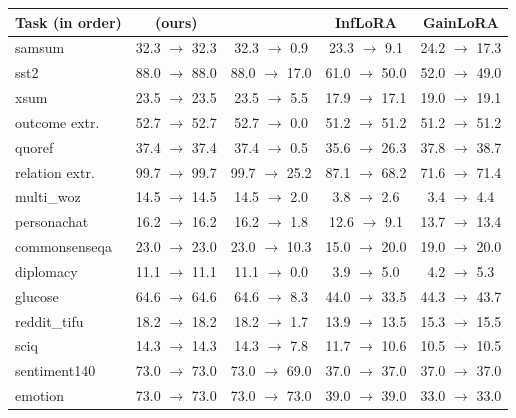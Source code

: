 \begin{tabular}{lcccc}
    \toprule
    Task (in order) & \cert{} (ours) & \plain{} & InfLoRA & GainLoRA \\
    \midrule
    samsum & 32.3 $\to$ 32.3 & 32.3 $\to$ 0.9 & 23.3 $\to$ 9.1 & 24.2 $\to$ 17.3 \\
    sst2 & 88.0 $\to$ 88.0 & 88.0 $\to$ 17.0 & 61.0 $\to$ 50.0 & 52.0 $\to$ 49.0 \\
    xsum & 23.5 $\to$ 23.5 & 23.5 $\to$ 5.5 & 17.9 $\to$ 17.1 & 19.0 $\to$ 19.1 \\
    outcome extr. & 52.7 $\to$ 52.7 & 52.7 $\to$ 0.0 & 51.2 $\to$ 51.2 & 51.2 $\to$ 51.2 \\
    quoref & 37.4 $\to$ 37.4 & 37.4 $\to$ 0.5 & 35.6 $\to$ 26.3 & 37.8 $\to$ 38.7 \\
    relation extr. & 99.7 $\to$ 99.7 & 99.7 $\to$ 25.2 & 87.1 $\to$ 68.2 & 71.6 $\to$ 71.4 \\
    multi\_woz & 14.5 $\to$ 14.5 & 14.5 $\to$ 2.0 & 3.8 $\to$ 2.6 & 3.4 $\to$ 4.4 \\
    personachat & 16.2 $\to$ 16.2 & 16.2 $\to$ 1.8 & 12.6 $\to$ 9.1 & 13.7 $\to$ 13.4 \\
    commonsenseqa & 23.0 $\to$ 23.0 & 23.0 $\to$ 10.3 & 15.0 $\to$ 20.0 & 19.0 $\to$ 20.0 \\
    diplomacy & 11.1 $\to$ 11.1 & 11.1 $\to$ 0.0 & 3.9 $\to$ 5.0 & 4.2 $\to$ 5.3 \\
    glucose & 64.6 $\to$ 64.6 & 64.6 $\to$ 8.3 & 44.0 $\to$ 33.5 & 44.3 $\to$ 43.7 \\
    reddit\_tifu & 18.2 $\to$ 18.2 & 18.2 $\to$ 1.7 & 13.9 $\to$ 13.5 & 15.3 $\to$ 15.5 \\
    sciq & 14.3 $\to$ 14.3 & 14.3 $\to$ 7.8 & 11.7 $\to$ 10.6 & 10.5 $\to$ 10.5 \\
    sentiment140 & 73.0 $\to$ 73.0 & 73.0 $\to$ 69.0 & 37.0 $\to$ 37.0 & 37.0 $\to$ 37.0 \\
    emotion & 73.0 $\to$ 73.0 & 73.0 $\to$ 73.0 & 39.0 $\to$ 39.0 & 33.0 $\to$ 33.0 \\
    \bottomrule
\end{tabular}
